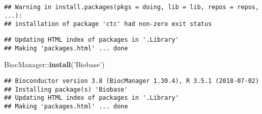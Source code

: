 \documentclass[]{article}
\newenvironment{Shaded}{\begin{snugshade}}{\end{snugshade}}
\newcommand{\KeywordTok}[1]{\textcolor[rgb]{0.13,0.29,0.53}{\textbf{{#1}}}}
\newcommand{\StringTok}[1]{\textcolor[rgb]{0.31,0.60,0.02}{{#1}}}
\newcommand{\NormalTok}[1]{{#1}}
\begin{document}
\begin{verbatim}
## Warning in install.packages(pkgs = doing, lib = lib, repos = repos, ...):
## installation of package 'ctc' had non-zero exit status
\end{verbatim}

\begin{verbatim}
## Updating HTML index of packages in '.Library'
## Making 'packages.html' ... done
\end{verbatim}

\begin{Shaded}
\begin{Highlighting}[]
\NormalTok{BiocManager::}\KeywordTok{install}\NormalTok{(}\StringTok{'Biobase'}\NormalTok{)}
\end{Highlighting}
\end{Shaded}

\begin{verbatim}
## Bioconductor version 3.8 (BiocManager 1.30.4), R 3.5.1 (2018-07-02)
## Installing package(s) 'Biobase'
## Updating HTML index of packages in '.Library'
## Making 'packages.html' ... done
\end{verbatim}
\end{document}
